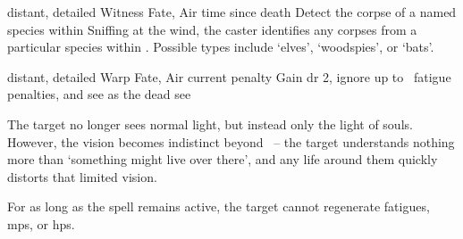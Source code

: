  {distant, detailed}%
  {Witness}%
  {Fate, Air}%
  {time since death}%
  {Detect the corpse of a named species within \spellRange}%
  {
    Sniffing at the wind, the caster identifies any corpses from a particular species within \spellRange.
    Possible types include `elves', `woodspies', or `bats'.
  }

  {distant, detailed}%
  {Warp}%
  {Fate, Air}%
  {current  penalty}%
  {Gain \gls{dr} 2, ignore up to ~\gls{fatigue} penalties, and see as the dead see}%
  {
    The target no longer sees normal light, but instead only the light of souls.
    However, the vision becomes indistinct beyond \spellRange\ -- the target understands nothing more than `something might live over there', and any life around them quickly distorts that limited vision.

    For as long as the spell remains active, the target cannot regenerate \glspl{fatigue}, \glspl{mp}, or \glspl{hp}.
  }

